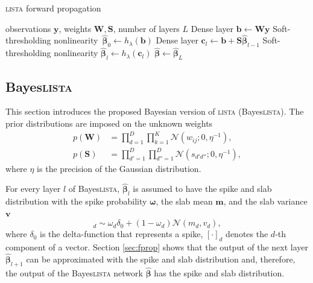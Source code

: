 \documentclass{article}
\begin{document}
  \begin{algorithm}[t]
    \caption{\textsc{lista} forward propagation}
    \label{alg:lista}
    \begin{algorithmic}[1]
      \REQUIRE observations $\mathbf{y}$, weights $\mathbf{W}, \mathbf{S}$, number of layers $L$
      \STATE Dense layer $\mathbf{b} \gets \mathbf{W}\mathbf{y}$ \label{eq:first_layer}
      \STATE Soft-thresholding nonlinearity~$\widehat{\boldsymbol\beta}_0 \gets h_\lambda(\mathbf{b})$ \label{eq:thr_first}
        \STATE Dense layer $\mathbf{c}_l \gets \mathbf{b} + \mathbf{S}\widehat{\boldsymbol\beta}_{l-1}$ \label{eq:l_dense_layer}
        \STATE Soft-thresholding nonlinearity $\widehat{\boldsymbol\beta}_{l} \gets h_\lambda(\mathbf{c}_l)$ \label{eq:l_thr}
      \ENDFOR
      \RETURN $\widehat{\boldsymbol\beta} \gets \widehat{\boldsymbol\beta}_{L}$
    \end{algorithmic}
  \end{algorithm}


  \subsection{Bayes\textsc{lista}}
  \label{subsec:bayesian_lista}
  This section introduces the proposed Bayesian version of \textsc{lista} (Bayes\textsc{lista}). The prior distributions are imposed on the unknown weights
  \begin{equation}
  \label{eq:ws}
  \begin{split}
  p(\mathbf{W}) &= \prod_{d=1}^D\prod_{k=1}^K \mathcal{N}(w_{ij} ; 0, \eta^{-1}), \\
  p(\mathbf{S}) &= \prod_{d'=1}^D\prod_{d''=1}^D \mathcal{N}(s_{d'd''} ; 0, \eta^{-1}),
  \end{split}
  \end{equation}
  where $\eta$ is the precision of the Gaussian distribution.
  
  For every layer $l$ of Bayes\textsc{lista}, $\widehat{\boldsymbol\beta}_{l}$ is assumed to have the spike and slab distribution with the spike probability $\boldsymbol\omega$, the slab mean $\mathbf{m}$, and the slab variance $\mathbf{v}$
  \begin{equation}
  [\widehat{\boldsymbol\beta}_{l}]_d \sim \omega_d \delta_0 + (1 - \omega_d)\mathcal{N}(m_d, v_d),
  \end{equation}
  where $\delta_0$ is the delta-function that represents a spike, $[\cdot]_d$ denotes the $d$-th component of a vector. Section \ref{sec:fprop} shows that the output of the next layer $\widehat{\boldsymbol\beta}_{l+1}$ can be approximated with the spike and slab distribution and, therefore, the output of the Bayes\textsc{lista} network $\widehat{\boldsymbol\beta}$ has the spike and slab distribution.
  
\end{document}
